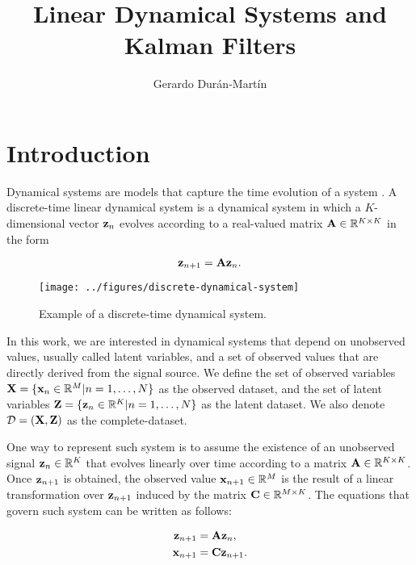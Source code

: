 \documentclass[11pt]{article}
\title{Linear Dynamical Systems and Kalman Filters}
\author{Gerardo Durán-Martín}
\numberwithin{equation}{section}
\newcommand{\x}{{\bf x}}
\newcommand{\X}{{\bf X}}
\newcommand{\z}{{\bf z}}
\newcommand{\Z}{{\bf Z}}
\newcommand{\R}{\mathbb{R}}
\begin{document}
\nocite{*}

\maketitle

\section{Introduction}

Dynamical systems are models that capture the time evolution of a system \cite{strogatz}. A discrete-time linear dynamical system is a dynamical system in which a $K$-dimensional vector $\z_n$ evolves according to a real-valued matrix ${\bf A}\in\R^{K\times K}$ in the form

\begin{equation}
	\z_{n+1} = {\bf A}\z_n.
\end{equation}

\begin{figure}[h!]
	\centering
	\texttt{[image: ../figures/discrete-dynamical-system]}
	\caption{Example of a discrete-time dynamical system.}
	\label{fig:discrete-dynamical-system}
\end{figure}



In this work, we are interested in dynamical systems that depend on unobserved values, usually called latent variables, and a set of observed values that are directly derived from the signal source. We define the set of observed variables $\X = \{\x_n \in \mathbb{R}^M \vert n=1,\ldots, N\}$ as the observed dataset, and the set of latent variables $\Z = \{\z_n \in \mathbb{R}^K \vert n=1,\ldots, N\}$ as the latent dataset. We also denote $\mathcal{D} = ({\bf X}, {\bf Z})$ as the complete-dataset.

One way to represent such system is to assume the existence of an unobserved signal $\z_n \in \mathbb{R}^K$ that evolves linearly over time according to a matrix ${\bf A}\in\mathbb{R}^{K\times K}$. Once $\z_{n+1}$ is obtained, the observed value $\x_{n+1} \in \mathbb{R}^M$ is the result of a linear transformation over $\z_{n+1}$ induced by the matrix ${\bf C}\in \mathbb{R}^{M\times K}$. The equations that govern such system can be written as follows:

\begin{align*}
	\z_{n+1} &= {\bf A} \z_{n},\\
	\x_{n+1} &= {\bf C} \z_{n+1}.
\end{align*}
\end{document}
